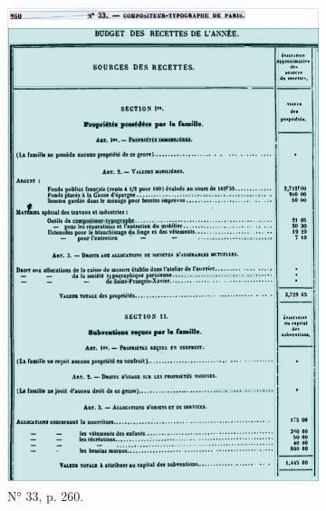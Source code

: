 \begin{figure}[t]
\begin{subfigure}{0.3\textwidth}
     \includegraphics[width=1\linewidth]{img/transkribus_33.png}
     \caption{N° 33, p. 260.}
     \label{fig:odm33tkb}
    \end{subfigure}
    \hspace{5pt}
    \begin{subfigure}{0.3\textwidth}

\end{subfigure}
\end{figure}
